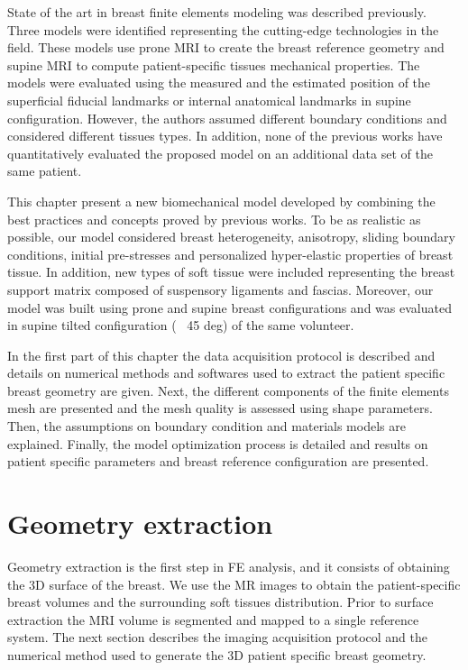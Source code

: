 
State of the art in breast finite elements modeling was described previously. Three models were identified representing the cutting-edge technologies in the field. These models use prone MRI to create the breast reference geometry and supine MRI to compute patient-specific tissues mechanical properties. The models were evaluated using the measured and the estimated position of the superficial fiducial landmarks or internal anatomical landmarks in supine configuration.   However, the authors assumed different boundary conditions and considered different tissues types.  
In addition, none of the previous works have quantitatively evaluated the proposed model on an additional data set of the same patient. 

 This chapter present a new biomechanical model developed by combining the best practices and concepts proved by previous works. To be as realistic as possible, our model considered breast heterogeneity, anisotropy, sliding boundary conditions, initial pre-stresses and personalized hyper-elastic properties of breast tissue. In addition, new types of soft tissue were included representing the breast support matrix composed of suspensory ligaments and fascias. Moreover, our model was built using prone and supine breast configurations and was evaluated in supine tilted configuration (~ 45 deg) of the same volunteer.

In the first part of this chapter the data acquisition protocol is described and details on numerical methods and softwares used to extract the patient specific breast geometry are given. Next, the different components of the finite elements mesh are presented and the mesh quality is assessed using shape parameters.  Then, the assumptions on boundary condition and materials models are explained. Finally, the model optimization process is detailed and results on patient specific parameters and breast reference configuration are presented.   
\clearpage
\section{Geometry extraction}\label{section:geometryextraction}

Geometry extraction is the first step in FE analysis, and it
consists of obtaining the 3D surface of the
breast. We use the MR images to obtain the patient-specific breast volumes and the surrounding soft tissues distribution. Prior to surface extraction the MRI volume is segmented and mapped to a single reference system. The next section describes the imaging acquisition protocol and the numerical method used to generate the 3D patient specific breast geometry.

